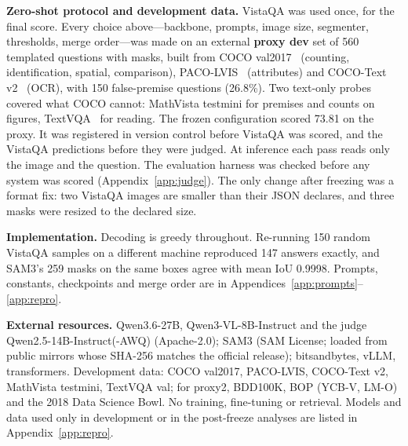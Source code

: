 \documentclass{article}
\begin{document}
\textbf{Zero-shot protocol and development data.} VistaQA was used once, for the final score. Every choice above---backbone, prompts, image size, segmenter, thresholds, merge
order---was made on an external \textbf{proxy dev} set of 560 templated questions with masks, built from COCO
val2017~\cite{coco} (counting, identification, spatial, comparison), PACO-LVIS~\cite{paco} (attributes) and COCO-Text
v2~\cite{cocotext} (OCR), with 150 false-premise questions (26.8\%). Two text-only probes covered what COCO cannot: MathVista
testmini for premises and counts on figures, TextVQA~\cite{textvqa} for reading. The frozen configuration scored 73.81 on the
proxy. It was registered in version control before VistaQA was scored, and the VistaQA predictions before they were
judged. At inference each pass reads only the image and the question. The evaluation harness was checked before any system was
scored (Appendix~\ref{app:judge}). The only change after freezing was a format fix: two VistaQA images are smaller than their JSON
declares, and three masks were resized to the declared size.

\textbf{Implementation.} Decoding is greedy throughout. Re-running 150 random VistaQA samples on a different
machine reproduced 147 answers exactly, and SAM3's 259 masks on the same boxes agree with mean IoU 0.9998. Prompts, constants,
checkpoints and merge order are in Appendices~\ref{app:prompts}--\ref{app:repro}.

\textbf{External resources.} Qwen3.6-27B, Qwen3-VL-8B-Instruct and the judge Qwen2.5-14B-Instruct(-AWQ) (Apache-2.0); SAM3
(SAM License; loaded from public mirrors whose SHA-256 matches the official release); bitsandbytes, vLLM, transformers.
Development data: COCO val2017, PACO-LVIS, COCO-Text v2, MathVista testmini, TextVQA val; for proxy2, BDD100K, BOP (YCB-V,
LM-O) and the 2018 Data Science Bowl. No training, fine-tuning or retrieval. Models and data used only in development or in
the post-freeze analyses are listed in Appendix~\ref{app:repro}.
\end{document}
